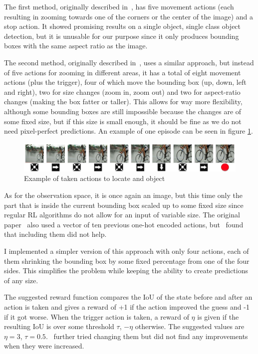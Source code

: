 \documentclass[
  digital,     %
  oneside,     %
  nosansbold,  %
  nocolorbold, %
  lof,         %
  lot,         %
]{fithesis4}
\begin{document}
The first method, originally described in~\cite{hierarchical_od_with_drl}, has five movement actions (each resulting in zooming towards one of the corners or the center of the image) and a stop action. It showed promising results on a single object, single class object detection, but it is unusable for our purpose since it only produces bounding boxes with the same aspect ratio as the image.

The second method, originally described in~\cite{iterative_od_with_rl}, uses a similar approach, but instead of five actions for zooming in different areas, it has a total of eight movement actions (plus the trigger), four of which move the bounding box (up, down, left and right), two for size changes (zoom in, zoom out) and two for aspect-ratio changes (making the box fatter or taller). This allows for way more flexibility, although some bounding boxes are still impossible because the changes are of some fixed size, but if this size is small enough, it should be fine as we do not need pixel-perfect predictions. An example of one episode can be seen in figure \ref{fig:exmaple_from_paper}.

\begin{figure}
    \centering
    \includegraphics[width=1\linewidth]{diagrams/45.jpg}
    \caption{Example of taken actions to locate and object~\cite{iterative_od_with_rl}}
    \label{fig:exmaple_from_paper}
\end{figure}

As for the observation space, it is once again an image, but this time only the part that is inside the current bounding box scaled up to some fixed size since regular RL algorithms do not allow for an input of variable size. The original paper~\cite{iterative_od_with_rl} also used a vector of ten previous one-hot encoded actions, but~\cite{rl_object_detection} found that including them did not help.

I implemented a simpler version of this approach with only four actions, each of them shrinking the bounding box by some fixed percentage from one of the four sides. This simplifies the problem while keeping the ability to create predictions of any size.

The suggested reward function compares the IoU of the state before and after an action is taken and gives a reward of +1 if the action improved the guess and -1 if it got worse. When the trigger action is taken, a reward of $\eta$ is given if the resulting IoU is over some threshold $\tau$, $-\eta$ otherwise. The suggested values are $\eta=3$, $\tau=0.5$. \cite{rl_object_detection}~further tried changing them but did not find any improvements when they were increased.
\end{document}
